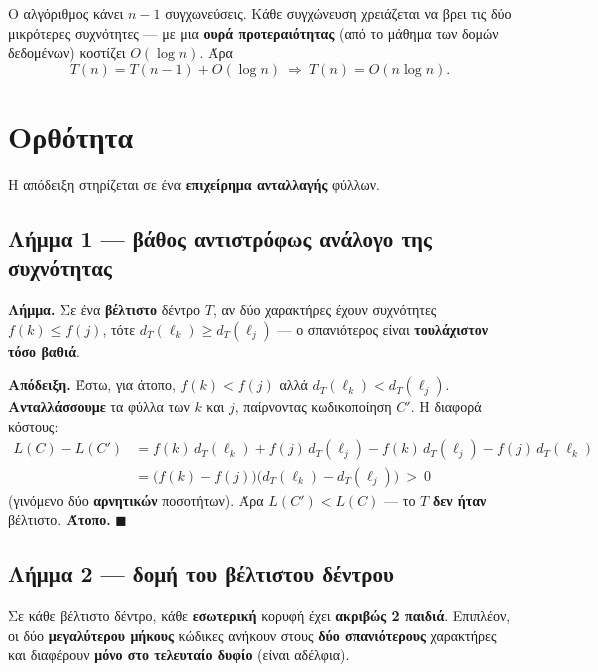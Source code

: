 \documentclass[11pt,a4paper]{article}
\begin{document}
Ο αλγόριθμος κάνει $n - 1$ συγχωνεύσεις. Κάθε συγχώνευση χρειάζεται να βρει τις
δύο μικρότερες συχνότητες --- με μια \textbf{ουρά προτεραιότητας} (από το μάθημα
των δομών δεδομένων) κοστίζει $O(\log n)$. Άρα
\[
T(n) = T(n - 1) + O(\log n) \ \Longrightarrow\ T(n) = O(n \log n).
\]

\section{Ορθότητα}

Η απόδειξη στηρίζεται σε ένα \textbf{επιχείρημα ανταλλαγής} φύλλων.

\subsection{Λήμμα 1 --- βάθος αντιστρόφως ανάλογο της συχνότητας}

\begin{keypoint}
\textbf{Λήμμα.} Σε ένα \textbf{βέλτιστο} δέντρο $T$, αν δύο χαρακτήρες έχουν
συχνότητες $f(k) \le f(j)$, τότε $d_T(\ell_k) \ge d_T(\ell_j)$ --- ο σπανιότερος
είναι \textbf{τουλάχιστον τόσο βαθιά}.
\end{keypoint}

\textbf{Απόδειξη.} Έστω, για άτοπο, $f(k) < f(j)$ αλλά
$d_T(\ell_k) < d_T(\ell_j)$. \textbf{Ανταλλάσσουμε} τα φύλλα των $k$ και $j$,
παίρνοντας κωδικοποίηση $C'$. Η διαφορά κόστους:
\[
\begin{aligned}
L(C) - L(C') &= f(k)\,d_T(\ell_k) + f(j)\,d_T(\ell_j) - f(k)\,d_T(\ell_j) -
f(j)\,d_T(\ell_k) \\
&= \bigl(f(k) - f(j)\bigr)\bigl(d_T(\ell_k) - d_T(\ell_j)\bigr) \ >\ 0
\end{aligned}
\]
(γινόμενο δύο \textbf{αρνητικών} ποσοτήτων). Άρα $L(C') < L(C)$ --- το $T$
\textbf{δεν ήταν} βέλτιστο. \textbf{Άτοπο.} $\blacksquare$

\subsection{Λήμμα 2 --- δομή του βέλτιστου δέντρου}

\begin{keypoint}
Σε κάθε βέλτιστο δέντρο, κάθε \textbf{εσωτερική} κορυφή έχει \textbf{ακριβώς 2
παιδιά}. Επιπλέον, οι δύο \textbf{μεγαλύτερου μήκους} κώδικες ανήκουν στους
\textbf{δύο σπανιότερους} χαρακτήρες και διαφέρουν \textbf{μόνο στο τελευταίο
δυφίο} (είναι αδέλφια).
\end{keypoint}
\end{document}
